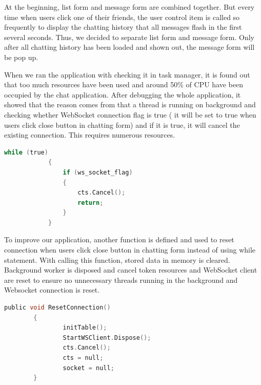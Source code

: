 \documentclass[a4paper,11pt]{article}
\begin{document}
At the beginning, list form and message form are combined together. But every time when users click one of their friends, the user control item is called so frequently to display the chatting history that all messages flash in the first several seconds. Thus, we decided to separate list form and message form. Only after all chatting history has been loaded and shown out, the message form will be pop up. 


When we ran the application with checking it in task manager, it is found out that too much resources have been used and around 50\% of CPU have been occupied by the chat application. After debugging the whole application, it showed that the reason comes from that a thread is running on background and checking whether WebSocket connection flag is true ( it will be set to true when users click close button in chatting form) and if it is true, it will cancel the existing connection. This requires numerous resources. 
\begin{lstlisting}[language=C]
while (true)
            {
                if (ws_socket_flag)
                {
                    cts.Cancel();
                    return;
                }
            }
\end{lstlisting}
To improve our application, another function is defined and used to reset connection when users click close button in chatting form instead of using while statement. With calling this function, stored data in memory is cleared. Background worker is disposed and cancel token resources and WebSocket client are reset to ensure no unnecessary threads running in the background and Websocket connection is reset. 
\begin{lstlisting}[language=C]
public void ResetConnection()
        {
                initTable();
                StartWSClient.Dispose();
                cts.Cancel();
                cts = null;
                socket = null;
        }

\end{lstlisting}
\end{document}
